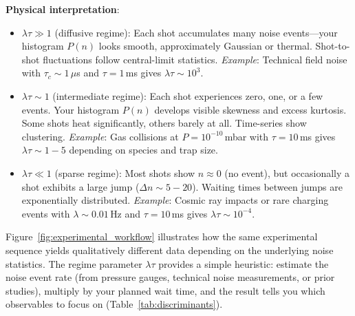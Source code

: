 \textbf{Physical interpretation}:
\begin{itemize}
\item \textbf{$\lambda\tau \gg 1$} (diffusive regime): Each shot accumulates many noise events—your histogram $P(n)$ looks smooth, approximately Gaussian or thermal. Shot-to-shot fluctuations follow central-limit statistics. \emph{Example}: Technical field noise with $\tau_c \sim 1\,\mu$s and $\tau = 1\,$ms gives $\lambda\tau \sim 10^3$.

\item \textbf{$\lambda\tau \sim 1$} (intermediate regime): Each shot experiences zero, one, or a few events. Your histogram $P(n)$ develops visible skewness and excess kurtosis. Some shots heat significantly, others barely at all. Time-series show clustering. \emph{Example}: Gas collisions at $P = 10^{-10}\,$mbar with $\tau = 10\,$ms gives $\lambda\tau \sim 1{-}5$ depending on species and trap size.

\item \textbf{$\lambda\tau \ll 1$} (sparse regime): Most shots show $n \approx 0$ (no event), but occasionally a shot exhibits a large jump ($\Delta n \sim 5{-}20$). Waiting times between jumps are exponentially distributed. \emph{Example}: Cosmic ray impacts or rare charging events with $\lambda \sim 0.01\,$Hz and $\tau = 10\,$ms gives $\lambda\tau \sim 10^{-4}$.
\end{itemize}


Figure~\ref{fig:experimental_workflow} illustrates how the same experimental sequence yields qualitatively different data depending on the underlying noise statistics. The regime parameter $\lambda\tau$ provides a simple heuristic: estimate the noise event rate (from pressure gauges, technical noise measurements, or prior studies), multiply by your planned wait time, and the result tells you which observables to focus on (Table~\ref{tab:discriminants}).

